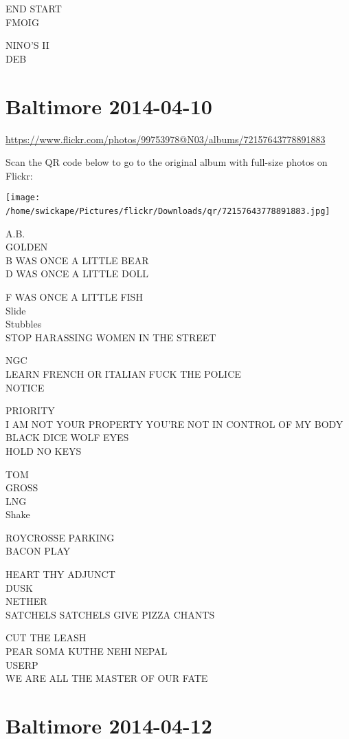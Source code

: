 \documentclass[10pt,letterpaper]{article}
\begin{document}
END START\\
FMOIG

NINO'S II\\
DEB
\

\section*{Baltimore 2014-04-10}

\url{https://www.flickr.com/photos/99753978@N03/albums/72157643778891883}

Scan the QR code below to go to the original album with full-size photos on Flickr:

\texttt{[image: /home/swickape/Pictures/flickr/Downloads/qr/72157643778891883.jpg]}
\

A.B.\\
GOLDEN\\
B WAS ONCE A LITTLE BEAR\\
D WAS ONCE A LITTLE DOLL

F WAS ONCE A LITTLE FISH\\
Slide\\
Stubbles\\
STOP HARASSING WOMEN IN THE STREET

NGC\\
LEARN FRENCH OR ITALIAN FUCK THE POLICE\\
NOTICE

PRIORITY\\
I AM NOT YOUR PROPERTY YOU'RE NOT IN CONTROL OF MY BODY\\
BLACK DICE WOLF EYES\\
HOLD NO KEYS

TOM\\
GROSS\\
LNG\\
Shake

ROYCROSSE PARKING\\
BACON PLAY

HEART THY ADJUNCT\\
DUSK\\
NETHER\\
SATCHELS SATCHELS GIVE PIZZA CHANTS

CUT THE LEASH\\
PEAR SOMA KUTHE NEHI NEPAL\\
USERP\\
WE ARE ALL THE MASTER OF OUR FATE
\

\section*{Baltimore 2014-04-12}
\end{document}
